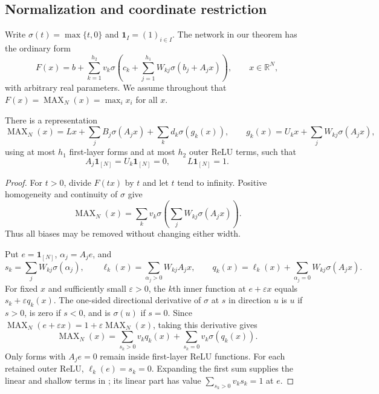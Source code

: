 
\subsection{Normalization and coordinate restriction}

Write $\sigma(t)=\max\{t,0\}$ and $\mathbf1_I=(1)_{i\in I}$.
The network in our theorem has the ordinary form
\begin{equation}\label{eq:clean-ordinary-network}
 F(x)=b+\sum_{k=1}^{h_2}v_k\sigma\!\left(
 c_k+\sum_{j=1}^{h_1}W_{kj}\sigma(b_j+A_jx)\right),
 \qquad x\in\mathbb R^N,
\end{equation}
with arbitrary real parameters.  We assume throughout that
$F(x)=\operatorname{MAX}_N(x)=\max_i x_i$ for all $x$.

\begin{lemma}\label{lem:clean-normalization}
There is a representation
\begin{equation}\label{eq:clean-normalized-network}
 \operatorname{MAX}_N(x)
 =Lx+\sum_j B_j\sigma(A_jx)+\sum_k d_k\sigma(g_k(x)),
 \qquad
 g_k(x)=U_kx+\sum_j W_{kj}\sigma(A_jx),
\end{equation}
using at most $h_1$ first-layer forms and at most $h_2$ outer ReLU terms,
such that
\[
 A_j\mathbf1_{[N]}=U_k\mathbf1_{[N]}=0,
 \qquad L\mathbf1_{[N]}=1.
\]
\end{lemma}

\begin{proof}
For $t>0$, divide $F(tx)$ by $t$ and let $t$ tend to infinity.  Positive
homogeneity and continuity of $\sigma$ give
\[
 \operatorname{MAX}_N(x)
 =\sum_k v_k\sigma\!\left(\sum_jW_{kj}\sigma(A_jx)\right).
\]
Thus all biases may be removed without changing either width.

Put $e=\mathbf1_{[N]}$, $\alpha_j=A_je$, and
\[
 s_k=\sum_jW_{kj}\sigma(\alpha_j),\qquad
 \ell_k(x)=\sum_{\alpha_j>0}W_{kj}A_jx,\qquad
 q_k(x)=\ell_k(x)+\sum_{\alpha_j=0}W_{kj}\sigma(A_jx).
\]
For fixed $x$ and sufficiently small $\varepsilon>0$, the $k$th inner
function at $e+\varepsilon x$ equals $s_k+\varepsilon q_k(x)$.
The one-sided directional derivative of $\sigma$ at $s$ in direction $u$
is $u$ if $s>0$, is zero if $s<0$, and is $\sigma(u)$ if $s=0$.
Since $\operatorname{MAX}_N(e+\varepsilon x)
=1+\varepsilon\operatorname{MAX}_N(x)$, taking this derivative gives
\[
 \operatorname{MAX}_N(x)
 =\sum_{s_k>0}v_kq_k(x)+\sum_{s_k=0}v_k\sigma(q_k(x)).
\]
Only forms with $A_je=0$ remain inside first-layer ReLU functions.
For each retained outer ReLU, $\ell_k(e)=s_k=0$.
Expanding the first sum supplies the linear and shallow terms in
; its linear part has value
$\sum_{s_k>0}v_ks_k=1$ at $e$.
\end{proof}

